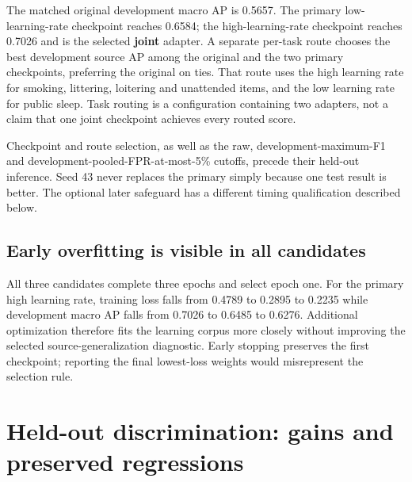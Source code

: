 The matched original development macro AP is 0.5657. The primary low-learning-rate checkpoint reaches 0.6584; the high-learning-rate checkpoint reaches 0.7026 and is the selected \textbf{joint} adapter. A separate per-task route chooses the best development source AP among the original and the two primary checkpoints, preferring the original on ties. That route uses the high learning rate for smoking, littering, loitering and unattended items, and the low learning rate for public sleep. Task routing is a configuration containing two adapters, not a claim that one joint checkpoint achieves every routed score.

Checkpoint and route selection, as well as the raw, development-maximum-F1 and development-pooled-FPR-at-most-5\% cutoffs, precede their held-out inference. Seed 43 never replaces the primary simply because one test result is better. The optional later safeguard has a different timing qualification described below.



\subsection{Early overfitting is visible in all candidates}
All three candidates complete three epochs and select epoch one. For the primary high learning rate, training loss falls from 0.4789 to 0.2895 to 0.2235 while development macro AP falls from 0.7026 to 0.6485 to 0.6276. Additional optimization therefore fits the learning corpus more closely without improving the selected source-generalization diagnostic. Early stopping preserves the first checkpoint; reporting the final lowest-loss weights would misrepresent the selection rule.


\section{Held-out discrimination: gains and preserved regressions}


